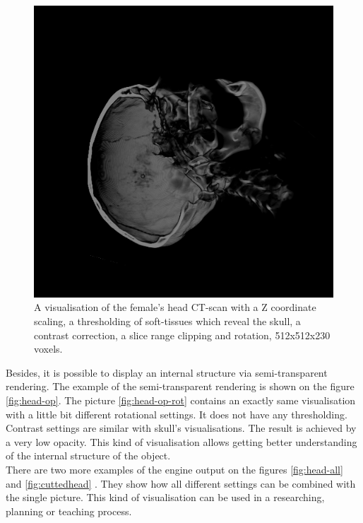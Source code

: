 \documentclass[twoside, english, 11pt]{report}
\begin{document}
\begin{figure}[H]
\centerline{\includegraphics[scale = 0.7]{img/head-clip-rot}}
\caption{A visualisation of the female's head CT-scan with a Z coordinate scaling, a thresholding of soft-tissues which reveal the skull, a contrast correction, a slice range clipping and rotation, 512x512x230 voxels.\label{fig:head-clip-rot}}
\end{figure}

Besides, it is possible to display an internal structure via semi-transparent rendering. The example of the semi-transparent rendering is shown on the figure \ref{fig:head-op}. The picture \ref{fig:head-op-rot} contains an exactly same visualisation with a little bit different rotational settings. It does not have any thresholding. Contrast settings are similar with skull's visualisations. The result is achieved by a very low opacity. This kind of visualisation allows getting better understanding of the internal structure of the object.\\

There are two more examples of the engine output on the figures \ref{fig:head-all} and \ref{fig:cuttedhead} . They show how all different settings can be combined with the single picture. This kind of visualisation can be used in a researching, planning or teaching process.
\end{document}
